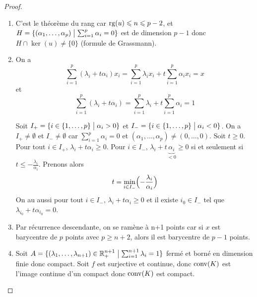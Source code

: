 \begin{proof}
	\phantom{}
	\begin{enumerate}
		\item C'est le théorème du rang car $\operatorname{rg}(u)\leqslant n\leqslant p-2$, et $H=\{(\alpha_{1},\dots,\alpha_{p})\bigm|\sum_{i=1}^{p}\alpha_{i}=0\}$ est de dimension $p-1$ donc $H\cap\ker(u)\neq\{0\}$ (formule de Grassmann).
		
		\item On a 
		\begin{equation}\sum_{i=1}^{p}(\lambda_{i}+t\alpha_{i})x_{i}=\sum_{i=1}^{p}\lambda_{i}x_{i}+t\sum_{i=1}^{p}\alpha_{i}x_{i}=x\end{equation}
		et
		\begin{equation}\sum_{i=1}^{p}(\lambda_{i}+t\alpha_{i})=\sum_{i=1}^{p}\lambda_{i}+t\sum_{i=1}^{p}\alpha_{i}=1\end{equation}

		Soit $I_{+}=\{i\in\{1,\dots,p\}\bigm|\alpha_{i}>0\}$ et $I_{-}=\{i\in\{1,\dots,p\}\bigm|\alpha_{i}<0\}$. On a $I_{+}\neq\emptyset$ et $I_{-}\neq\emptyset$ car $\sum_{i=1}^{p}\alpha_{i}=0$ et $(\alpha_{1},\dots,\alpha_{p})\neq(0,\dots,0)$. Soit $t\geqslant0$. Pour tout $i\in I_{+}$, $\lambda_{i}+t\alpha_{i}\geqslant0$. Pour $i\in I_{-}$, $\lambda_{i}+t\underbrace{\alpha_{i}}_{<0}\geqslant 0$ si et seulement si $t\leqslant-\frac{\lambda_{i}}{\alpha_{i}}$. Prenons alors 
		\begin{equation}t=\min\limits_{i\in I_{-}}\Bigl(-\frac{\lambda_{i}}{\alpha_{i}}\Bigr)\end{equation}
		On au aussi pour tout $i\in I_{-}$, $\lambda_{i}+t\alpha_{i}\geqslant 0$ et il existe $i_{0}\in I_{-}$ tel que $\lambda_{i_{0}}+t\alpha_{i_{0}}=0$.

		\item Par récurrence descendante, on se ramène à n+1 points car si $x$ est barycentre de $p$ points avec $p\geqslant n+2$, alors il est barycentre de $p-1$ points.
		
		\item Soit $A=\{(\lambda_{1},\dots,\lambda_{n+1})\in\mathbb{R}_{+}^{n+1}\bigm|\sum_{i=1}^{n+1}\lambda_{i}=1\}$ fermé et borné en dimension finie donc compact. Soit 
		$f$ est surjective et continue, donc $\operatorname{conv}(K)$ est l'image continue d'un compact donc $\operatorname{conv}(K)$ est compact.
	\end{enumerate}
\end{proof}

